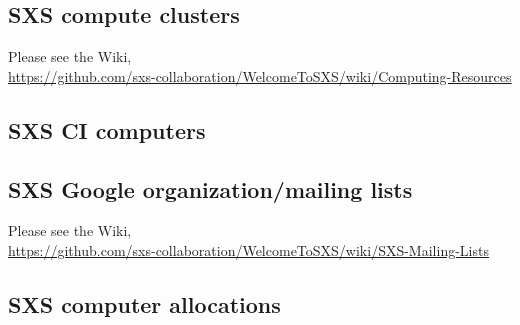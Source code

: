 \documentclass[12pt]{article}
\begin{document}
\subsection{ SXS compute clusters}
Please see the Wiki, \\
\url{https://github.com/sxs-collaboration/WelcomeToSXS/wiki/Computing-Resources}
\subsection{ SXS CI computers}
\subsection{ SXS Google organization/mailing lists}
Please see the Wiki,\\
\url{https://github.com/sxs-collaboration/WelcomeToSXS/wiki/SXS-Mailing-Lists}
\subsection{SXS computer allocations}
\end{document}
